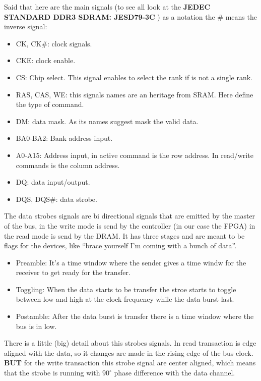 Said that here are the main signals (to see all look at the \textbf{JEDEC STANDARD DDR3 SDRAM: JESD79-3C} ) as a notation the \# means the inverse signal:


\begin{itemize}
    \item CK, CK\#: clock signals.
    \item CKE: clock enable.
    \item CS: Chip select. This signal enables to select the rank if is not a single rank.
    \item RAS, CAS, WE: this signals names are an heritage from SRAM. Here define the type of command.
    \item DM: data mask. As its names suggest mask the valid data.
    \item BA0-BA2: Bank address input.
    \item A0-A15: Address input, in active command is the row address. In read/write commands is the column address.
    \item DQ: data input/output.
    \item DQS, DQS\#: data strobe.
\end{itemize}


The data strobes signals are bi directional signals that are emitted by the master of the bus, in the write mode is send by the controller (in our case the FPGA) in the read mode is send by the DRAM. It has three stages and are meant to be flags for the devices, like 
 ``brace yourself I'm coming with a bunch of data''.

\begin{itemize}
    \item Preamble: It's a time window where the sender gives a time windw for the receiver to get ready for the transfer.
    \item Toggling: When the data starts to be transfer the stroe starts to toggle between low and high at the clock frequency while the data burst last.
    \item Postamble: After the data burst is transfer there is a time window where the bus is in low.
\end{itemize}

There is a little (big) detail about this strobes signals. In read transaction is edge aligned with the data, so it changes are made in the rising edge of the bus clock. \textbf{BUT} for the write transaction this strobe signal are center aligned, which means that the strobe is running with $90^{\circ}$ phase difference with the data channel.


